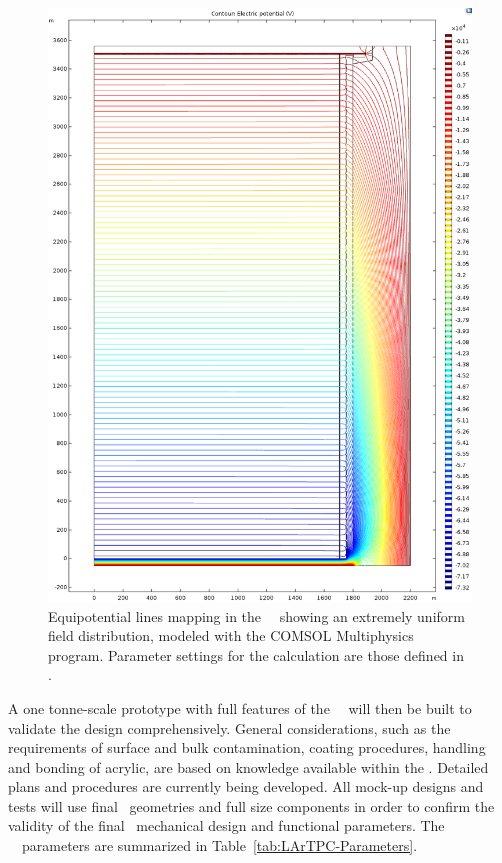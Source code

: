 \begin{figure}[!t]
\centering
\includegraphics[height=0.95\textheight]{./Figures/TPC-Field-Map.PNG}
\caption[Simulated electric field mapping of the \DSks\ \LArTPC]{Equipotential lines mapping in the \DSks\ \TPC\ showing an extremely uniform field distribution, modeled with the COMSOL Multiphysics program.  Parameter settings for the calculation are those defined in .}
\label{fig:TPC_Field}
\end{figure}

A one tonne-scale prototype with full features of the \DSk\ \TPC\ will then be built to validate the design comprehensively. General considerations, such as the requirements of surface and bulk contamination, coating procedures, handling and bonding of acrylic, are based on knowledge available within the \GADMC. Detailed plans and procedures are currently being developed. All mock-up designs and tests will use final \DSks\ geometries and full size components in order to confirm the validity of the final \DSks\ mechanical design and functional parameters. The \DSks\ \LArTPC\ parameters are summarized in Table~\ref{tab:LArTPC-Parameters}.


